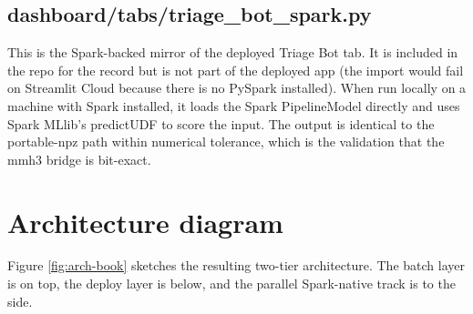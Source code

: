 \documentclass[11pt,letterpaper]{book}
\begin{document}
\subsection*{dashboard/tabs/triage\_bot\_spark.py}

This is the Spark-backed mirror of the deployed Triage Bot tab. It is included in the repo for the record but is not part of the deployed app (the import would fail on Streamlit Cloud because there is no PySpark installed). When run locally on a machine with Spark installed, it loads the Spark PipelineModel directly and uses Spark MLlib's predictUDF to score the input. The output is identical to the portable-npz path within numerical tolerance, which is the validation that the mmh3 bridge is bit-exact.

\section{Architecture diagram}

Figure \ref{fig:arch-book} sketches the resulting two-tier architecture. The batch layer is on top, the deploy layer is below, and the parallel Spark-native track is to the side.
\end{document}
